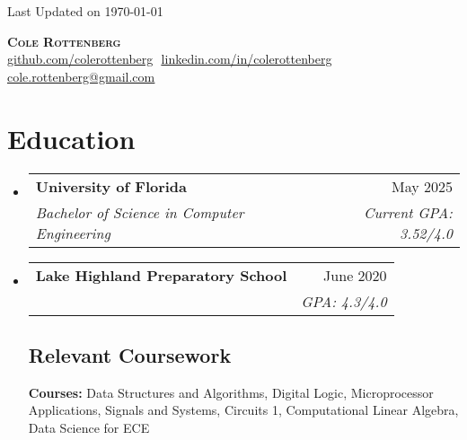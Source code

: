 \documentclass[letterpaper,11pt]{article}
\makeatletter
\newcommand{\resumeSubheading}[4]{
  \vspace{-2pt}\item
    \begin{tabular*}{0.97\textwidth}[t]{l@{\extracolsep{\fill}}r}
      \textbf{#1} & #2 \\
      \textit{\small#3} & \textit{\small #4} \\
    \end{tabular*}\vspace{-7pt}
}
\newcommand{\resumeSubHeadingListStart}{\begin{itemize}[leftmargin=0.15in, label={}]}
\newcommand{\resumeSubHeadingListEnd}{\end{itemize}}
\makeatother
\begin{document}
\begin{flushright}
  \vspace{-4pt}
  \color{gray}
  \item
  Last Updated on \today 
\end{flushright}

\vspace{-7pt}

\begin{center}
    \textbf{\Huge \scshape Cole Rottenberg } \\ \vspace{8pt}
    \small 
    \href{https://github.com/johnDoe}{\underline{github.com/colerottenberg}} $  $
    \href{https://linkedin.com/in/colerottenberg}{\underline{linkedin.com/in/colerottenberg}} $  $
    \href{mailto:cole.rottenberg@gmail.com}
    {\underline{cole.rottenberg@gmail.com}}
\end{center}

\section{Education}
  \resumeSubHeadingListStart
  
    \resumeSubheading
      {University of Florida}{May 2025}
      {Bachelor of Science in Computer Engineering}{Current GPA: 3.52/4.0}
      
    \resumeSubheading
      {Lake Highland Preparatory School }{June 2020}
      {}{GPA: 4.3/4.0}

    \vspace{-10pt}
    \subsection{Relevant Coursework}
      \textbf{Courses:} Data Structures and Algorithms, Digital Logic, Microprocessor Applications, Signals and Systems, Circuits 1, Computational Linear Algebra, Data Science for ECE\\

  \resumeSubHeadingListEnd

\end{document}

